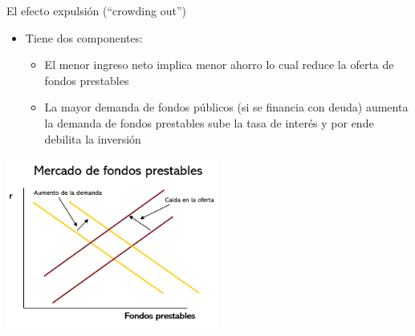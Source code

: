\documentclass{beamer}
\begin{document}
\begin{frame}{El efecto expulsión (“crowding out”)}

    \begin{itemize}
    \footnotesize\item Tiene dos componentes:
        \begin{itemize}
        \scriptsize\item El menor ingreso neto implica menor ahorro lo cual reduce la oferta de fondos prestables
        \scriptsize\item La mayor demanda de fondos públicos (si se financia con deuda) aumenta la demanda de fondos prestables sube la tasa de interés y por ende debilita la inversión
        \scriptsize\end{itemize}
    \end{itemize}
    
    \vspace{0.2cm}
    
    \centering\includegraphics[width=7cm]{P87.png}\

\end{frame}




    
\end{document}
